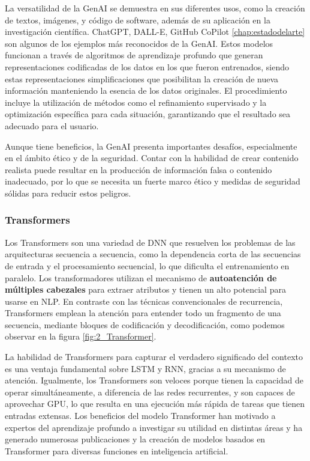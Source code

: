 La versatilidad de la \acrshort{GenAI} se demuestra en sus diferentes usos, como la creación de textos, imágenes, y código de software, además de su aplicación en la investigación científica. ChatGPT, DALL-E, GitHub CoPilot \ref{chap:estadodelarte} son algunos de los ejemplos más reconocidos de la \acrlong{GenAI}.
Estos modelos funcionan a través de algoritmos de aprendizaje profundo que generan representaciones codificadas de los datos en los que fueron entrenados, siendo estas representaciones simplificaciones que posibilitan la creación de nueva información manteniendo la esencia de los datos originales. El procedimiento incluye la utilización de métodos como el refinamiento supervisado y la optimización específica para cada situación, garantizando que el resultado sea adecuado para el usuario.

Aunque tiene beneficios, la \acrlong{GenAI} presenta importantes desafíos, especialmente en el ámbito ético y de la seguridad. Contar con la habilidad de crear contenido realista puede resultar en la producción de información falsa o contenido inadecuado, por lo que se necesita un fuerte marco ético y medidas de seguridad sólidas para reducir estos peligros.

\subsubsection{Transformers}
\label{subsubsec:transformers}

Los Transformers son una variedad de \acrfull{DNN} que resuelven los problemas de las arquitecturas secuencia a secuencia, como la dependencia corta de las secuencias de entrada y el procesamiento secuencial, lo que dificulta el entrenamiento en paralelo. Los transformadores \cite{bender2022generacion} utilizan el mecanismo de \textbf{autoatención de múltiples cabezales} para extraer atributos y tienen un alto potencial para usarse en \acrshort{NLP}. En contraste con las técnicas convencionales de recurrencia, Transformers emplean la atención para entender todo un fragmento de una secuencia, mediante bloques de codificación y decodificación, como podemos observar en la figura \ref{fig:2_Transformer}.

La habilidad de Transformers para capturar el verdadero significado del contexto es una ventaja fundamental sobre \acrfull{LSTM} y  \acrfull{RNN}, gracias a su mecanismo de atención. Igualmente, los Transformers son veloces porque tienen la capacidad de operar simultáneamente, a diferencia de las redes recurrentes, y son capaces de aprovechar \acrshort{GPU}, lo que resulta en una ejecución más rápida de tareas que tienen entradas extensas. Los beneficios del modelo Transformer han motivado a expertos del aprendizaje profundo a investigar su utilidad en distintas áreas y ha generado numerosas publicaciones y la creación de modelos basados en Transformer para diversas funciones en inteligencia artificial.

